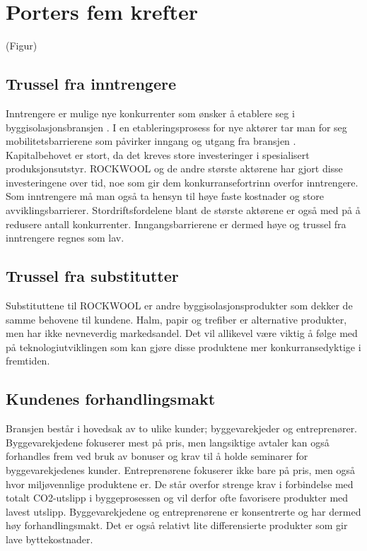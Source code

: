 \section{Porters fem krefter}
(Figur)

\subsection{Trussel fra inntrengere}
Inntrengere er mulige nye konkurrenter som ønsker å etablere seg i byggisolasjonsbransjen \cite[s.~94]{FjeldstadogLunnan2018}. I en etableringsprosess for nye aktører tar man for seg mobilitetsbarrierene som påvirker inngang og utgang fra bransjen \cite[s.~90]{FjeldstadogLunnan2018}. Kapitalbehovet er stort, da det kreves store investeringer i spesialisert produksjonsutstyr. ROCKWOOL og de andre største aktørene har gjort disse investeringene over tid, noe som gir dem konkurransefortrinn overfor inntrengere. Som inntrengere må man også ta hensyn til høye faste kostnader og store avviklingsbarrierer. Stordriftsfordelene blant de største aktørene er også med på å redusere antall konkurrenter. Inngangsbarrierene er dermed høye og trussel fra inntrengere regnes som lav.

\subsection{Trussel fra substitutter}
Substituttene til ROCKWOOL er andre byggisolasjonsprodukter som dekker de samme behovene til kundene. Halm, papir og trefiber er alternative produkter, men har ikke nevneverdig markedsandel. Det vil allikevel være viktig å følge med på teknologiutviklingen som kan gjøre disse produktene mer konkurransedyktige i fremtiden.

\subsection{Kundenes forhandlingsmakt}
Bransjen består i hovedsak av to ulike kunder; byggevarekjeder og entreprenører. Byggevarekjedene fokuserer mest på pris, men langsiktige avtaler kan også forhandles frem ved bruk av bonuser og krav til å holde seminarer for byggevarekjedenes kunder. Entreprenørene fokuserer ikke bare på pris, men også hvor miljøvennlige produktene er. De står overfor strenge krav i forbindelse med totalt CO2-utslipp i byggeprosessen og vil derfor ofte favorisere produkter med lavest utslipp. Byggevarekjedene og entreprenørene er konsentrerte og har dermed høy forhandlingsmakt. Det er også relativt lite differensierte produkter som gir lave byttekostnader.

